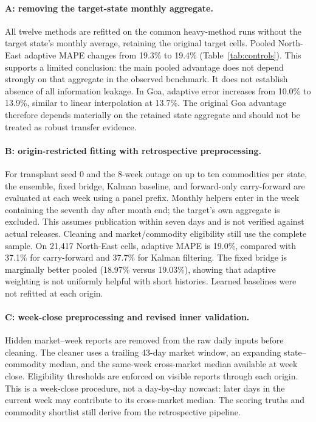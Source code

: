 \documentclass[sigconf,nonacm,balance=false]{acmart}
\begin{document}
\paragraph{A: removing the target-state monthly aggregate.}
All twelve methods are refitted on the common heavy-method runs without the target state's monthly average, retaining the original target cells. Pooled North-East adaptive MAPE changes from 19.3\% to 19.4\% (Table~\ref{tab:controls}). This supports a limited conclusion: the main pooled advantage does not depend strongly on that aggregate in the observed benchmark. It does not establish absence of all information leakage. In Goa, adaptive error increases from 10.0\% to 13.9\%, similar to linear interpolation at 13.7\%. The original Goa advantage therefore depends materially on the retained state aggregate and should not be treated as robust transfer evidence.

\paragraph{B: origin-restricted fitting with retrospective preprocessing.}
For transplant seed 0 and the 8-week outage on up to ten commodities per state, the ensemble, fixed bridge, Kalman baseline, and forward-only carry-forward are evaluated at each week using a panel prefix. Monthly helpers enter in the week containing the seventh day after month end; the target's own aggregate is excluded. This assumes publication within seven days and is not verified against actual releases. Cleaning and market/commodity eligibility still use the complete sample. On 21,417 North-East cells, adaptive MAPE is 19.0\%, compared with 37.1\% for carry-forward and 37.7\% for Kalman filtering. The fixed bridge is marginally better pooled (18.97\% versus 19.03\%), showing that adaptive weighting is not uniformly helpful with short histories. Learned baselines were not refitted at each origin.



\paragraph{C: week-close preprocessing and revised inner validation.}
Hidden market--week reports are removed from the raw daily inputs before cleaning. The cleaner uses a trailing 43-day market window, an expanding state--commodity median, and the same-week cross-market median available at week close. Eligibility thresholds are enforced on visible reports through each origin. This is a week-close procedure, not a day-by-day nowcast: later days in the current week may contribute to its cross-market median. The scoring truths and commodity shortlist still derive from the retrospective pipeline.
\end{document}

